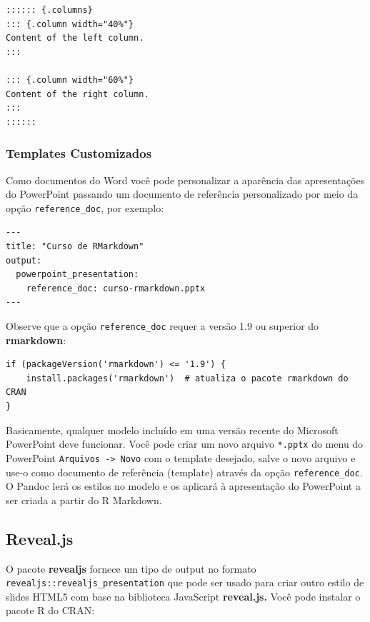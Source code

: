 \documentclass[
]{book}
\begin{document}
\begin{verbatim}
:::::: {.columns}
::: {.column width="40%"}
Content of the left column.
:::

::: {.column width="60%"}
Content of the right column.
:::
::::::
\end{verbatim}

\hypertarget{templates-customizados-1}{%
\subsubsection*{Templates Customizados}\label{templates-customizados-1}}

Como documentos do Word você pode personalizar a aparência das apresentações do PowerPoint passando um documento de referência personalizado por meio da opção \texttt{reference\_doc}, por exemplo:

\begin{verbatim}
---
title: "Curso de RMarkdown"
output:
  powerpoint_presentation:
    reference_doc: curso-rmarkdown.pptx
---
\end{verbatim}

Observe que a opção \texttt{reference\_doc} requer a versão 1.9 ou superior do \textbf{rmarkdown}:

\begin{verbatim}
if (packageVersion('rmarkdown') <= '1.9') {
    install.packages('rmarkdown')  # atualiza o pacote rmarkdown do CRAN
}
\end{verbatim}

Basicamente, qualquer modelo incluído em uma versão recente do Microsoft PowerPoint deve funcionar. Você pode criar um novo arquivo \texttt{*.pptx} do menu do PowerPoint \texttt{Arquivos\ -\textgreater{}\ Novo} com o template desejado, salve o novo arquivo e use-o como documento de referência (template) através da opção \texttt{reference\_doc}. O Pandoc lerá os estilos no modelo e os aplicará à apresentação do PowerPoint a ser criada a partir do R Markdown.

\hypertarget{reveal.js}{%
\subsection{Reveal.js}\label{reveal.js}}

O pacote \textbf{revealjs} fornece um tipo de output no formato \texttt{revealjs::revealjs\_presentation} que pode ser usado para criar outro estilo de slides HTML5 com base na biblioteca JavaScript \textbf{reveal.js.} Você pode instalar o pacote R do CRAN:
\end{document}
